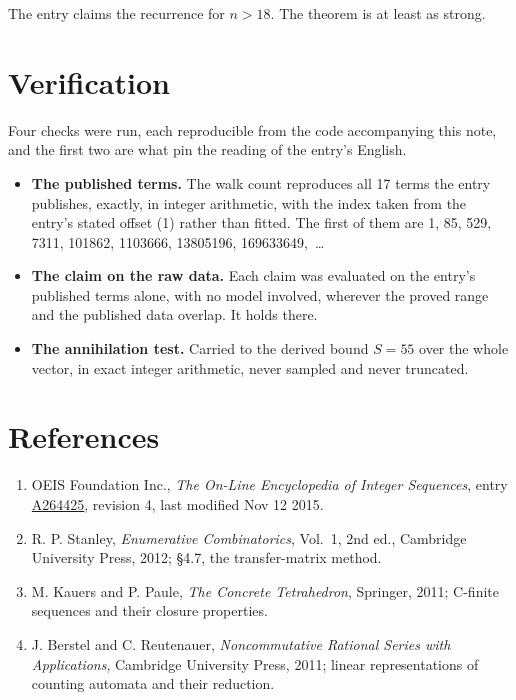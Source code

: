 \documentclass[11pt]{article}
\theoremstyle{definition}
\begin{document}
The entry claims the recurrence for $n > 18$. The theorem is at least as strong.

\section{Verification}

Four checks were run, each reproducible from the code accompanying this note, and the first two are what pin the reading of the entry's English.

\begin{itemize}

\item {\bfseries The published terms.} The walk count reproduces all 17 terms the entry publishes, exactly, in integer arithmetic, with the index taken from the entry's stated offset (1) rather than fitted. The first of them are 1, 85, 529, 7311, 101862, 1103666, 13805196, 169633649,~\dots

\item {\bfseries The claim on the raw data.} Each claim was evaluated on the entry's published terms alone, with no model involved, wherever the proved range and the published data overlap. It holds there.

\item {\bfseries The annihilation test.} Carried to the derived bound $S = 55$ over the whole vector, in exact integer arithmetic, never sampled and never truncated.

\end{itemize}

\section{References}

\begin{enumerate}

\item OEIS Foundation Inc., \emph{The On-Line Encyclopedia of Integer Sequences}, entry \href{https://oeis.org/A264425}{A264425}, revision 4, last modified Nov 12 2015.

\item R. P. Stanley, \emph{Enumerative Combinatorics}, Vol.~1, 2nd ed., Cambridge University Press, 2012; \S4.7, the transfer-matrix method.

\item M. Kauers and P. Paule, \emph{The Concrete Tetrahedron}, Springer, 2011; C-finite sequences and their closure properties.

\item J. Berstel and C. Reutenauer, \emph{Noncommutative Rational Series with Applications}, Cambridge University Press, 2011; linear representations of counting automata and their reduction.

\end{enumerate}
\end{document}
